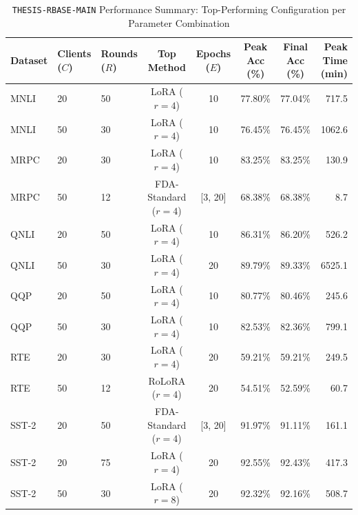 \documentclass[10pt,a4paper]{article}
\begin{document}
\begin{table}[H]
\centering
\caption{\texttt{THESIS-RBASE-MAIN} Performance Summary: Top-Performing Configuration per Parameter Combination}
\label{tab:global_summary}
\scriptsize
\setlength{\tabcolsep}{3.5pt}
\begin{tabular*}{\textwidth}{@{\extracolsep{\fill}}lllccccr@{}}
\toprule
\textbf{Dataset} & \textbf{Clients ($C$)} & \textbf{Rounds ($R$)} & \textbf{Top Method} & \textbf{Epochs ($E$)} & \textbf{Peak Acc (\%)} & \textbf{Final Acc (\%)} & \textbf{Peak Time (min)} \\
\midrule
MNLI & 20 & 50 & LoRA ($r=4$) & 10 & 77.80\% & 77.04\% & 717.5 \\ 
MNLI & 50 & 30 & LoRA ($r=4$) & 10 & 76.45\% & 76.45\% & 1062.6 \\ 
MRPC & 20 & 30 & LoRA ($r=4$) & 10 & 83.25\% & 83.25\% & 130.9 \\ 
MRPC & 50 & 12 & FDA-Standard ($r=4$) & [3, 20] & 68.38\% & 68.38\% & 8.7 \\ 
QNLI & 20 & 50 & LoRA ($r=4$) & 10 & 86.31\% & 86.20\% & 526.2 \\ 
QNLI & 50 & 30 & LoRA ($r=4$) & 20 & 89.79\% & 89.33\% & 6525.1 \\ 
QQP & 20 & 50 & LoRA ($r=4$) & 10 & 80.77\% & 80.46\% & 245.6 \\ 
QQP & 50 & 30 & LoRA ($r=4$) & 10 & 82.53\% & 82.36\% & 799.1 \\ 
RTE & 20 & 30 & LoRA ($r=4$) & 20 & 59.21\% & 59.21\% & 249.5 \\ 
RTE & 50 & 12 & RoLoRA ($r=4$) & 20 & 54.51\% & 52.59\% & 60.7 \\ 
SST-2 & 20 & 50 & FDA-Standard ($r=4$) & [3, 20] & 91.97\% & 91.11\% & 161.1 \\ 
SST-2 & 20 & 75 & LoRA ($r=4$) & 20 & 92.55\% & 92.43\% & 417.3 \\ 
SST-2 & 50 & 30 & LoRA ($r=8$) & 20 & 92.32\% & 92.16\% & 508.7 \\ 
\bottomrule
\end{tabular*}
\end{table}
\end{document}
